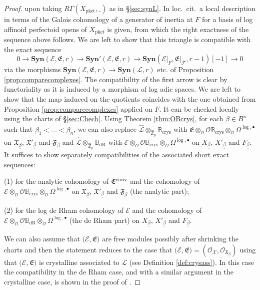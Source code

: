 \documentclass[asterisque,english]{smfart}
\begin{document}
\begin{proof}
upon taking $R\Gamma(X_{\mathrm{pket}},\_)$ as in \S \ref{sec:synL}. In loc.~cit.~a local description in terms of the Galois cohomology of a generator of inertia at $F$ for a basis of log affinoid perfectoid opens of $X_{\mathrm{pket}}$ is given, from which the right exactness of the sequence above follows. We are left to show that this triangle is compatible with  the exact sequence $$0\longrightarrow \mathbf{Syn}(\mathcal{E},\mathfrak{E},r)\longrightarrow  \mathbf{Syn}'(\mathcal{E},\mathfrak{E},r)\longrightarrow \mathbf{Syn}(\mathcal{E}\vert_F,\mathfrak{E}\vert_{\mathcal{\overline{F}}},r-1)[-1]\longrightarrow 0$$via the morphisms  $\mathbf{Syn}(\mathcal{E},\mathfrak{E},r)\to   \mathbf{Syn}(\mathcal{L},r)$ etc. of Proposition \ref{prop:comparecomplexes}. The compatibility of the first arrow is clear by functoriality as it is induced by a morphism of log adic spaces. We are left to show that the map induced on the quotients coincides with the one obtained from Proposition \ref{prop:comparecomplexes} applied on $F$. It can be checked locally using the charts of \S \ref{sec:Chech}. Using Theorem \ref{thm:OBcrys}, for each $\underline{\beta}\in B^n$ such that $\beta_1<\ldots < \beta_n$,  we can also replace  $\widehat{\mathcal{L}}\otimes_{\widehat{\mathbb{Z}}_p}  \mathbb{B}_{\mathrm{crys}}$ with $\mathfrak{E}\otimes_{\mathcal{O}} \mathcal{O}\mathbb{B}_{\mathrm{crys}}\otimes_{\mathcal{O}} \Omega^{\log,\bullet}$ on $\mathfrak{X}_{\underline{\beta}}$, $\mathfrak{X}'_{\underline{\beta}}$ and $\mathfrak{F}_{\underline{\beta}}$ and  $\widehat{\mathcal{L}}\otimes_{\widehat{\mathbb{Z}}_p}  \mathbb{B}_{\mathrm{dR}}$ with $\mathcal{E}\otimes_{\mathcal{O}} \mathcal{O}\mathbb{B}_{\mathrm{crys}}\otimes_{\mathcal{O}} \Omega^{\log,\bullet}$ on $X_{\underline{\beta}}$, $X'_{\underline{\beta}}$ and $F_{\underline{\beta}}$.
It suffices to show separately compatibilities of the associated short exact sequences: \smallskip

(1) for the analytic cohomology of  $\mathfrak{E}^{\rm conv}$ and the cohomology of $\mathcal{E}\otimes_{\mathcal{O}} \mathcal{O}\mathbb{B}_{\mathrm{crys}}\otimes_{\mathcal{O}} \Omega^{\log,\bullet} $ on $\mathfrak{X}_{\underline{\beta}}$, $\mathfrak{X}'_{\underline{\beta}}$ and $\mathfrak{F}_{\underline{\beta}}$ (the analytic part);

\smallskip
(2) for the log de Rham cohomology of 
$\mathcal{E}$ and the cohomology of $\mathcal{E}\otimes_{\mathcal{O}} \mathcal{O}\mathbb{B}_{\mathrm{dR}}\otimes_{\mathcal{O}} \Omega^{\log,\bullet}$ (the de Rham part) on $X_{\underline{\beta}}$, $X'_{\underline{\beta}}$ and $F_{\underline{\beta}}$. 

\smallskip
We can also assume that $\bigl(\mathcal{E},\mathfrak{E}\bigr)$ are free modules possibly after shrinking the charts  and then the statement reduces to the case that $\bigl(\mathcal{E},\mathfrak{E}\bigr)=(\mathcal{O}_{\mathcal{X}},\mathcal{O}_{\mathfrak{X}_{\underline{\beta}}})$ using that $\bigl(\mathcal{E},\mathfrak{E}\bigr)$ is crystalline associated to $\mathcal{L}$ (see Definition \ref{def:crysass}).  In this case the compatibility in the de Rham case, and with a similar argument in the crystalline case, is shown in the proof of \cite[Prop. 4.3.17]{LLZ}. 
\end{proof}
\end{document}
